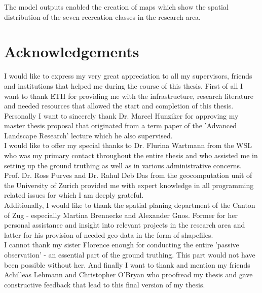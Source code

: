 The model outputs enabled the creation of maps which show the spatial distribution of the seven recreation-classes in the research area. \\

\cleardoublepage

\chapter*{Acknowledgements} \label{acknowledgements}
I would like to express my very great appreciation to all my supervisors, friends and institutions that helped me during the course of this thesis. First of all I want to thank ETH for providing me with the infrastructure, research literature and needed resources that allowed the start and completion of this thesis.\\
Personally I want to sincerely thank Dr. Marcel Hunziker for approving my master thesis proposal that originated from a term paper of the 'Advanced Landscape Research' lecture which he also supervised. \\
I would like to offer my special thanks to Dr. Flurina Wartmann from the WSL who was my primary contact throughout the entire thesis and who assisted me in setting up the ground truthing as well as in various administrative concerns. \\
Prof. Dr. Ross Purves and Dr. Rahul Deb Das from the geocomputation unit of the University of Zurich provided me with expert knowledge in all programming related issues for which I am deeply grateful.\\

Additionally, I would like to thank the spatial planing department of the Canton of Zug - especially Martina Brennecke and Alexander Gnos. Former for her personal assistance and insight into relevant projects in the research area and latter for his provision of needed geo-data in the form of shapefiles.\\

I cannot thank my sister Florence enough for conducting the entire 'passive observation' - an essential part of the ground truthing. This part would not have been possible without her. And finally I want to thank and mention my friends Achilleas Lehmann and Christopher O'Bryan who proofread my thesis and gave constructive feedback that lead to this final version of my thesis.

\cleardoublepage


